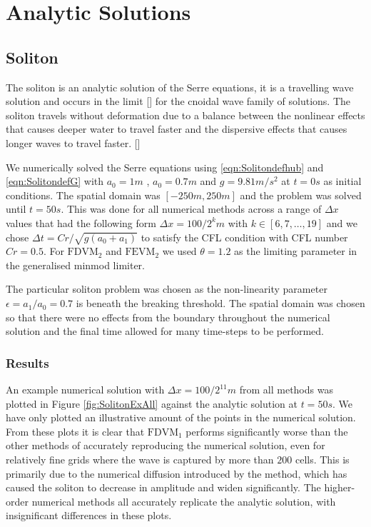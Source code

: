 \section{Analytic Solutions}

\subsection{Soliton}
The soliton is an analytic solution of the Serre equations, it is a travelling wave solution and occurs in the limit [] for the cnoidal wave family of solutions. The soliton travels without deformation due to a balance between the nonlinear effects that causes deeper water to travel faster and the dispersive effects that causes longer waves to travel faster. []

We numerically solved the Serre equations using \eqref{eqn:Solitondefhub} and \eqref{eqn:SolitondefG} with $a_0 = 1m$ , $a_0 = 0.7m$ and $g= 9.81m/s^2$ at $t=0s$ as initial conditions. The spatial domain was $[-250m,250m]$ and the problem was solved until $t= 50s$. This was done for all numerical methods across a range of $\Delta x$ values that had the following form $\Delta x = 100 / 2^k m$ with $k \in  \left[6,7, \dots,19\right]$ and we chose $\Delta t = Cr / \sqrt{g\left(a_0 + a_1\right)}$ to satisfy the CFL condition with CFL number $Cr = 0.5$. For $\text{FDVM}_2$ and $\text{FEVM}_2$ we used $\theta  = 1.2$ as the limiting parameter in the generalised minmod limiter. 

The particular soliton problem was chosen as the non-linearity parameter $\epsilon = a_1 / a_0 = 0.7$ is beneath the breaking threshold. The spatial domain was chosen so that there were no effects from the boundary throughout the numerical solution and the final time allowed for many time-steps to be performed. 

\subsubsection{Results}
An example numerical solution with $\Delta x = {100} / {2^{11}}m$ from all methods was plotted in Figure \ref{fig:SolitonExAll} against the analytic solution at $t= 50s$. We have only plotted an illustrative amount of the points in the numerical solution. From these plots it is clear that $\text{FDVM}_1$ performs significantly worse than the other methods of accurately reproducing the numerical solution, even for relatively fine grids where the wave is captured by more than $200$ cells. This is primarily due to the numerical diffusion introduced by the method, which has caused the soliton to decrease in amplitude and widen significantly. The higher-order numerical methods all accurately replicate the analytic solution, with insignificant differences in these plots.

